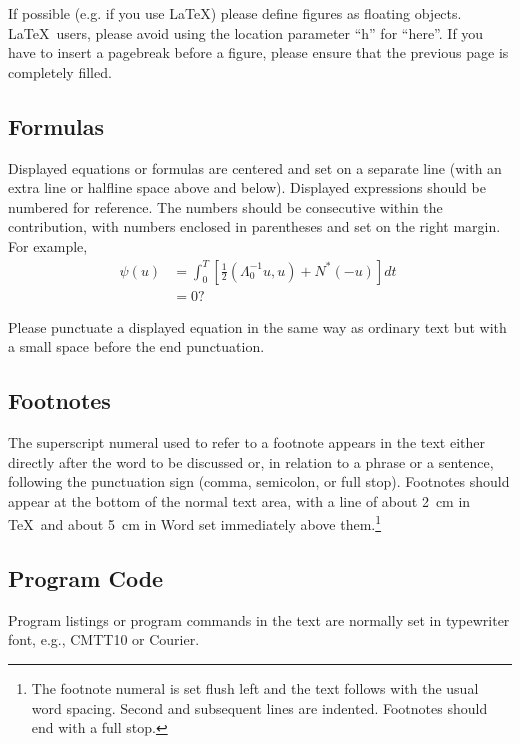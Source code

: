 \documentclass[runningheads]{llncs}
\begin{document}
If possible (e.g. if you use \LaTeX) please define figures as floating
objects. \LaTeX\ users, please avoid using the location
parameter ``h'' for ``here''. If you have to insert a pagebreak before a
figure, please ensure that the previous page is completely filled.


\subsection{Formulas}

Displayed equations or formulas are centered and set on a separate
line (with an extra line or halfline space above and below). Displayed
expressions should be numbered for reference. The numbers should be
consecutive within the contribution,
with numbers enclosed in parentheses and set on the right margin.
For example,
\begin{align}
  \psi (u) & = \int_{0}^{T} \left[\frac{1}{2}
  \left(\Lambda_{0}^{-1} u,u\right) + N^{\ast} (-u)\right] dt \; \\
& = 0 ?
\end{align}

Please punctuate a displayed equation in the same way as ordinary
text but with a small space before the end punctuation.

\subsection{Footnotes}

The superscript numeral used to refer to a footnote appears in the text
either directly after the word to be discussed or, in relation to a
phrase or a sentence, following the punctuation sign (comma,
semicolon, or full stop). Footnotes should appear at the bottom of
the
normal text area, with a line of about 2~cm in \TeX\ and about 5~cm in
Word set
immediately above them.\footnote{The footnote numeral is set flush left
and the text follows with the usual word spacing. Second and subsequent
lines are indented. Footnotes should end with a full stop.}


\subsection{Program Code}

Program listings or program commands in the text are normally set in
typewriter font, e.g., CMTT10 or Courier.
\end{document}

